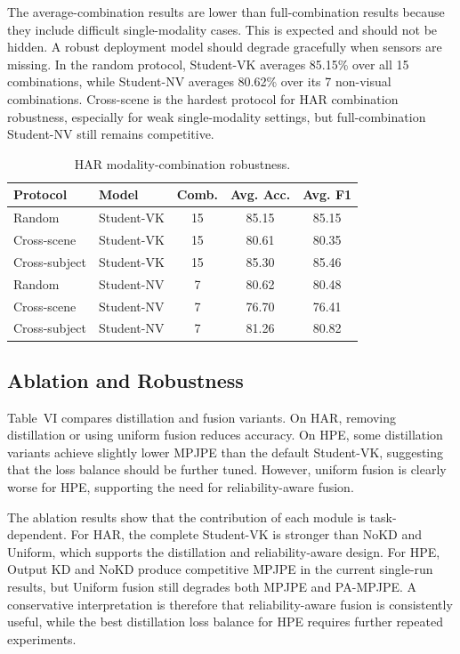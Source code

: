 \documentclass[journal, twocolumn, transmag]{IEEEtran}
\newcommand{\smalltab}{\scriptsize}
\begin{document}
The average-combination results are lower than full-combination results because they include difficult single-modality cases. This is expected and should not be hidden. A robust deployment model should degrade gracefully when sensors are missing. In the random protocol, Student-VK averages 85.15\% over all 15 combinations, while Student-NV averages 80.62\% over its 7 non-visual combinations. Cross-scene is the hardest protocol for HAR combination robustness, especially for weak single-modality settings, but full-combination Student-NV still remains competitive.

\begin{table}[t]
	\caption{HAR modality-combination robustness.}
	\label{tab:har-combo}
	\centering
	\smalltab
	\begin{tabular}{llccc}
		\toprule
		Protocol & Model & Comb. & Avg. Acc. & Avg. F1\\
		\midrule
		Random & Student-VK & 15 & 85.15 & 85.15\\
		Cross-scene & Student-VK & 15 & 80.61 & 80.35\\
		Cross-subject & Student-VK & 15 & 85.30 & 85.46\\
		Random & Student-NV & 7 & 80.62 & 80.48\\
		Cross-scene & Student-NV & 7 & 76.70 & 76.41\\
		Cross-subject & Student-NV & 7 & 81.26 & 80.82\\
		\bottomrule
	\end{tabular}
\end{table}

\subsection{Ablation and Robustness}
Table~VI compares distillation and fusion variants. On HAR, removing distillation or using uniform fusion reduces accuracy. On HPE, some distillation variants achieve slightly lower MPJPE than the default Student-VK, suggesting that the loss balance should be further tuned. However, uniform fusion is clearly worse for HPE, supporting the need for reliability-aware fusion.

The ablation results show that the contribution of each module is task-dependent. For HAR, the complete Student-VK is stronger than NoKD and Uniform, which supports the distillation and reliability-aware design. For HPE, Output KD and NoKD produce competitive MPJPE in the current single-run results, but Uniform fusion still degrades both MPJPE and PA-MPJPE. A conservative interpretation is therefore that reliability-aware fusion is consistently useful, while the best distillation loss balance for HPE requires further repeated experiments.
\end{document}
